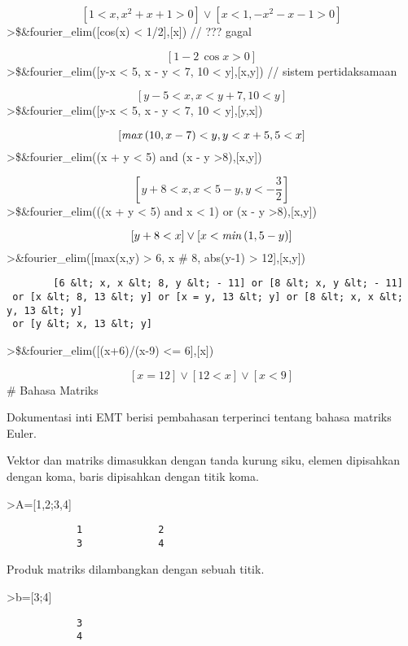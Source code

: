 \documentclass[
]{book}
\begin{document}
\[\left[ 1<x , x^2+x+1>0 \right] \lor \left[ x<1 , -x^2-x-1>0\right]\]\textgreater\$\&fourier\_elim({[}cos(x) \textless{} 1/2{]},{[}x{]}) // ??? gagal

\[\left[ 1-2\,\cos x>0 \right]\]\textgreater\$\&fourier\_elim({[}y-x \textless{} 5, x - y \textless{} 7, 10 \textless{} y{]},{[}x,y{]}) // sistem pertidaksamaan

\[\left[ y-5<x , x<y+7 , 10<y \right]\]\textgreater\$\&fourier\_elim({[}y-x \textless{} 5, x - y \textless{} 7, 10 \textless{} y{]},{[}y,x{]})

\[\left[ {\it max}\left(10 , x-7\right)<y , y<x+5 , 5<x \right]\]\textgreater\$\&fourier\_elim((x + y \textless{} 5) and (x - y \textgreater8),{[}x,y{]})

\[\left[ y+8<x , x<5-y , y<-\frac{3}{2} \right]\]\textgreater\$\&fourier\_elim(((x + y \textless{} 5) and x \textless{} 1) or (x - y \textgreater8),{[}x,y{]})

\[\left[ y+8<x \right] \lor \left[ x<{\it min}\left(1 , 5-y\right)\right]\]\textgreater\&fourier\_elim({[}max(x,y) \textgreater{} 6, x \# 8, abs(y-1) \textgreater{} 12{]},{[}x,y{]})

\begin{verbatim}
        [6 &lt; x, x &lt; 8, y &lt; - 11] or [8 &lt; x, y &lt; - 11]
 or [x &lt; 8, 13 &lt; y] or [x = y, 13 &lt; y] or [8 &lt; x, x &lt; y, 13 &lt; y]
 or [y &lt; x, 13 &lt; y]
\end{verbatim}

\textgreater\$\&fourier\_elim({[}(x+6)/(x-9) \textless= 6{]},{[}x{]})

\[\left[ x=12 \right] \lor \left[ 12<x \right] \lor \left[ x<9\right]\] \# Bahasa Matriks

Dokumentasi inti EMT berisi pembahasan terperinci tentang bahasa matriks Euler.

Vektor dan matriks dimasukkan dengan tanda kurung siku, elemen dipisahkan dengan koma, baris dipisahkan dengan titik koma.

\textgreater A={[}1,2;3,4{]}

\begin{verbatim}
            1             2 
            3             4 
\end{verbatim}

Produk matriks dilambangkan dengan sebuah titik.

\textgreater b={[}3;4{]}

\begin{verbatim}
            3 
            4 
\end{verbatim}
\end{document}

